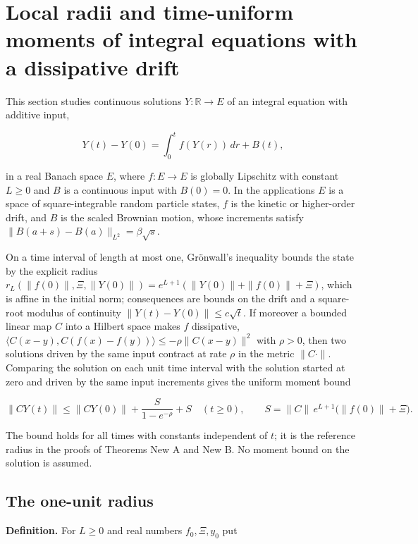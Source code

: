 \documentclass[11pt,a4paper]{report}
\begin{document}
\section{\texorpdfstring{Local radii and time-uniform moments of integral equations with a dissipative drift}{Local radii and time-uniform moments of integral equations with a dissipative drift}}


This section studies continuous solutions \(Y:\mathbb R\to E\) of an integral equation with additive input,


\[Y(t)-Y(0)=\int_0^tf(Y(r))\,dr+B(t),\]


in a real Banach space \(E\), where \(f:E\to E\) is globally Lipschitz with constant \(L\ge0\) and \(B\) is a continuous input with \(B(0)=0\). In the applications \(E\) is a space of square-integrable random particle states, \(f\) is the kinetic or higher-order drift, and \(B\) is the scaled Brownian motion, whose increments satisfy \(\|B(a+s)-B(a)\|_{L^2}=\beta\sqrt s\).




On a time interval of length at most one, Grönwall's inequality bounds the state by the explicit radius \(r_L(\|f(0)\|,\Xi,\|Y(0)\|)=e^{L+1}(\|Y(0)\|+\|f(0)\|+\Xi)\), which is affine in the initial norm; consequences are bounds on the drift and a square-root modulus of continuity \(\|Y(t)-Y(0)\|\le c\sqrt t\). If moreover a bounded linear map \(C\) into a Hilbert space makes \(f\) dissipative, \(\langle C(x-y),C(f(x)-f(y))\rangle\le-\rho\|C(x-y)\|^2\) with \(\rho>0\), then two solutions driven by the same input contract at rate \(\rho\) in the metric \(\|C\cdot\|\). Comparing the solution on each unit time interval with the solution started at zero and driven by the same input increments gives the uniform moment bound


\[\|CY(t)\|\le\|CY(0)\|+\frac{S}{1-e^{-\rho}}+S\quad(t\ge0),\qquad S=\|C\|\,e^{L+1}\bigl(\|f(0)\|+\Xi\bigr).\]


The bound holds for all times with constants independent of \(t\); it is the reference radius in the proofs of Theorems New A and New B. No moment bound on the solution is assumed.

\subsection{\texorpdfstring{The one-unit radius}{The one-unit radius}}


\textbf{Definition.} For \(L\ge0\) and real numbers \(f_0,\Xi,y_0\) put
\end{document}
